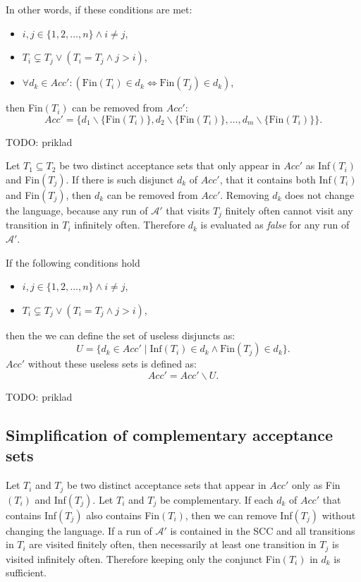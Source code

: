 \documentclass[
  digital, %
  twoside, %
  table,   %
  lof,     %
  lot,     %
]{fithesis3}
\begin{document}
In other words, if these conditions are met:
\begin{itemize}
  \item $i, j \in \{1,2, \dots, n\} \wedge i \neq j$,
  \item $T_i \subsetneq T_j \vee (T_i = T_j \wedge j > i)$,
  \item $\forall d_k \in Acc' \colon (\text{Fin}(T_i) \in d_k \Leftrightarrow \text{Fin}(T_j) \in d_k)$,
\end{itemize}
then Fin$(T_i)$ can be removed from $Acc'$:
\begin{equation*}
  Acc' = \{d_1 \smallsetminus \{\text{Fin}(T_i)\}, d_2 \smallsetminus \{\text{Fin}(T_i)\}, \dots, d_m \smallsetminus \{\text{Fin}(T_i)\}\}.
\end{equation*}

TODO: priklad

Let $T_1 \subseteq T_2$ be two distinct acceptance sets that only appear in $Acc'$ as Inf$(T_i)$ and Fin$(T_j)$. If there is such disjunct $d_k$ of $Acc'$, that it contains both Inf$(T_i)$ and Fin$(T_j)$, then $d_k$ can be removed from $Acc'$. Removing $d_k$ does not change the language, because any run of $\mathcal{A'}$ that visits $T_j$ finitely often cannot visit any transition in $T_i$ infinitely often. Therefore $d_k$ is evaluated as \emph{false} for any run of $\mathcal{A'}$. 

If the following conditions hold
\begin{itemize}
  \item $i, j \in \{1, 2, \dots, n\} \wedge i \neq j$,
  \item $T_i \subsetneq T_j \vee (T_i = T_j \wedge j > i)$,
\end{itemize}
then the we can define the set of useless disjuncts as:
\begin{equation*}
  U = \{d_k \in Acc' \mid \text{Inf}(T_i) \in d_k \wedge \text{Fin}(T_j) \in d_k \}.
\end{equation*}
$Acc'$ without these useless sets is defined as:
\begin{equation*}
  Acc' = Acc' \smallsetminus U.
\end{equation*}

TODO: priklad

\subsection{Simplification of complementary acceptance sets}
Let $T_i$ and $T_j$ be two distinct acceptance sets that appear in $Acc'$ only as Fin$(T_i)$ and Inf$(T_j)$. Let $T_i$ and $T_j$ be complementary. If each $d_k$ of $Acc'$ that contains Inf$(T_j)$ also contains Fin$(T_i)$, then we can remove Inf$(T_j)$ without changing the language. If a run of $\mathcal{A'}$ is contained in the SCC and all transitions in $T_i$ are visited finitely often, then necessarily at least one transition in $T_j$ is visited infinitely often. Therefore keeping only the conjunct Fin$(T_i)$ in $d_k$ is sufficient. 
\end{document}
